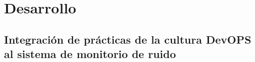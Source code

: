 \chapter{Desarrollo}
\section{Integración de prácticas de la cultura DevOPS al sistema de monitorio de ruido}